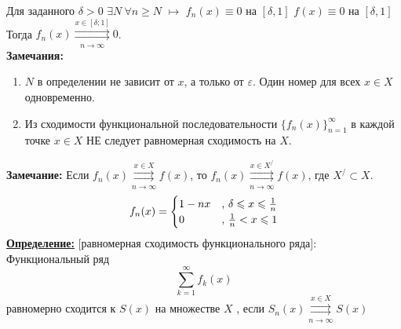 \documentclass[a4paper,12pt]{article} %
\renewcommand {\geq}{\geqslant}
\renewcommand {\leq}{\leqslant}
\begin{document}
Для заданного $\delta > 0$ $\exists N ~\forall n \geq N $ $\longmapsto$ \newline
\hspace*{40 mm} $f_n(x) \equiv 0$ на $[\delta, 1]$ \newline
\hspace*{40 mm} $f(x) \equiv 0$ на $[\delta, 1]$ \newline
Тогда $f_n(x) \overset{x \in [\delta;1]}{\underset{n \rightarrow \infty}{\rightrightarrows}} 0$.\\
\textbf{Замечания:}\newline
\begin{enumerate}
	\item $N$ в определении не зависит от $x$, а только от $\varepsilon$. Один номер для всех $x \in X$ одновременно.
	
	\item Из сходимости функциональной последовательности $\{f_n(x)\}_{n=1}^\infty$ в каждой точке $x \in X$ НЕ следует равномерная сходимость на $X$.
	
\end{enumerate}
\textbf{Замечание:} Если $f_n(x) \overset{x \in X}{\underset{n \rightarrow \infty}{\rightrightarrows}} f(x)$, то 
$f_n(x) \overset{x \in X^/}{\underset{n \rightarrow \infty}{\rightrightarrows}} f(x)$, где $X^/ \subset X$.
\begin{equation*}
	f_n(x) = 
	\begin{cases}
		1-nx &\text{, $\delta \leq x \leq {1 \over n}$}\\
		0 &\text{, ${1\over n}< x\leq 1$}
	\end{cases}
\end{equation*}
\underline{\textbf{Определение:}} [равномерная сходимость функционального ряда]:\newline 
Функциональный ряд $$\sum\limits_{k = 1}^{\infty}  f_k(x)$$ равномерно сходится к $S(x)$ на множестве $X$ , если $S_n(x) \overset{x \in X}{\underset{n \rightarrow \infty}{\rightrightarrows}} S(x)$
\end{document}
